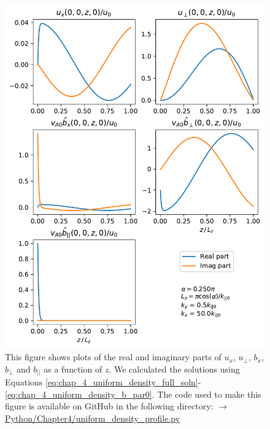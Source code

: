 \begin{figure}
    \centering
    \vspace{-20pt}
    \includegraphics[width=\textwidth,height=0.95\textheight,keepaspectratio]{figures/chapter04/uniform_density_profile.pdf}
    \vspace{-10pt}
    \caption{This figure shows plots of the real and imaginary parts of $u_x$, $u_\perp$, $b_x$, $b_\perp$ and $b_{||}$ as a function of $z$. We calculated the solutions using Equations \eqref{eq:chap_4_uniform_density_full_soln}-\eqref{eq:chap_4_uniform_density_b_par0}. The code used to make this figure is available on GitHub in the following directory:\newline
    \href{https://github.com/aleksyprok/apkp_thesis/blob/main/Python/Chapter4/uniform_density_profile.py}{$\rightarrow$ Python/Chapter4/uniform\_density\_profile.py}}
    \label{fig:uniform_density_profile}
    \vspace{-20pt}
\end{figure}

